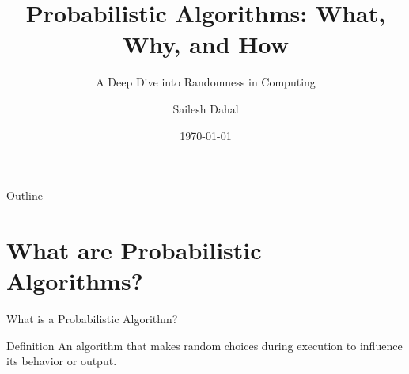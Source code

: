 \documentclass[aspectratio=169]{beamer}
\title{Probabilistic Algorithms: What, Why, and How}
\subtitle{A Deep Dive into Randomness in Computing}
\author{Sailesh Dahal}
\institute{Kathmandu University}
\date{\today}
\begin{document}
\begin{frame}
  \titlepage
\end{frame}

\begin{frame}{Outline}
  \tableofcontents
\end{frame}

\section{What are Probabilistic Algorithms?}
\begin{frame}{What is a Probabilistic Algorithm?}
  \begin{block}{Definition}
    An algorithm that makes random choices during execution to influence its behavior or output.
  \end{block}
\end{frame}
\end{document}
